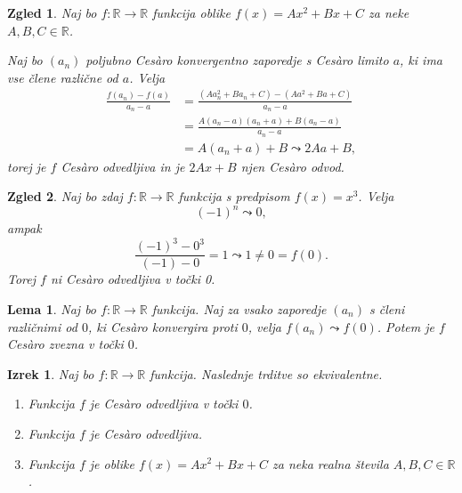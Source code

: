 \documentclass[10pt,hyperref={unicode}]{beamer}
\newtheorem{izrek}{Izrek}
\newtheorem{lema}{Lema}
\newtheorem{zgled}{Zgled}
\begin{document}
\begin{frame}
    \begin{zgled}
        \label{vseodv}
        Naj bo $f: \mathbb{R} \rightarrow \mathbb{R}$ funkcija oblike $f(x) = Ax^2 + Bx + C$ za neke $A, B, C \in \mathbb{R}$. 
        \pause
        
        Naj bo $(a_n)$ poljubno Ces\`{a}ro konvergentno zaporedje s Ces\`{a}ro limito $a$, ki ima vse člene različne od $a$. 
        \pause
        Velja 
        \begin{align*}
            \frac{f(a_n)-f(a)}{a_n-a} &= \frac{(Aa_n^2 + Ba_n + C)-(Aa^2 + Ba + C)}{a_n-a}\\
            &= \frac{A(a_n-a)(a_n+a) + B(a_n-a)}{a_n-a}\\
            &= A(a_n+a) + B \leadsto 2Aa + B,
        \end{align*}
        torej je $f$ Ces\`{a}ro odvedljiva in je $2Ax + B$ njen Ces\`{a}ro odvod.
    \end{zgled}
\end{frame}

\begin{frame}
    \begin{zgled}
        Naj bo zdaj $f: \mathbb{R} \rightarrow \mathbb{R}$ funkcija s predpisom $f(x) = x^3$. Velja 
        $$(-1)^n \leadsto 0,$$ 
        ampak 
        $$\frac{(-1)^3-0^3}{(-1)-0} = 1 \leadsto 1 \neq 0 = f(0).$$ 
        Torej $f$ ni Ces\`{a}ro odvedljiva v točki 0.
    \end{zgled}
\end{frame}

\begin{frame}
    \begin{lema}
        \label{lema}
        Naj bo $f: \mathbb{R} \rightarrow \mathbb{R}$ funkcija. Naj za vsako zaporedje $(a_n)$ s členi različnimi od $0$, ki Ces\`{a}ro konvergira proti $0$, velja $f(a_n) \leadsto f(0)$. Potem je $f$ Ces\`{a}ro zvezna v točki $0$.
    \end{lema}
\end{frame}

\begin{frame}
    \begin{izrek}
        \label{klasodv}
        Naj bo $f: \mathbb{R} \rightarrow \mathbb{R}$ funkcija. Naslednje trditve so ekvivalentne.
        \begin{enumerate}
            \item Funkcija $f$ je Ces\`{a}ro odvedljiva v točki $0$.
            \item Funkcija $f$ je Ces\`{a}ro odvedljiva.
            \item Funkcija $f$ je oblike $f(x) = Ax^2 + Bx + C$ za neka realna števila $A, B, C \in \mathbb{R}$.
        \end{enumerate}
    \end{izrek}
\end{frame}
\end{document}
